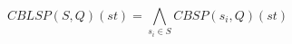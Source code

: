 \begin{itemize}
\begin{code}
        \AgdaSpace{}%
        \AgdaSpace{}%
        \AgdaSymbol{)}\<%
        \\
        \\[\AgdaEmptyExtraSkip]%
        \>[2]\AgdaSpace{}%
        \AgdaSymbol{:}\AgdaSpace{}%
        \AgdaSymbol{(}\AgdaSpace{}%
        \AgdaSpace{}%
        \AgdaSymbol{)}\AgdaSpace{}%
        \AgdaSpace{}%
        \<%
        \\
        \>[2]\AgdaSpace{}%
        \AgdaSymbol{(}\AgdaSpace{}%
        \AgdaOperator{\AgdaInductiveConstructor{,}}\AgdaSpace{}%
        \AgdaSymbol{)}\AgdaSpace{}%
        \AgdaSymbol{=}\AgdaSpace{}%
        \AgdaSpace{}%
        \AgdaSpace{}%
        \AgdaSpace{}%
        \AgdaSpace{}%
        \AgdaSpace{}%
        \AgdaSpace{}%
        \AgdaSpace{}%
        \AgdaSpace{}%
        \AgdaSpace{}%
        \AgdaSymbol{(}\AgdaSpace{}%
        \AgdaSymbol{(}\AgdaSpace{}%
        \AgdaOperator{\AgdaInductiveConstructor{,}}\AgdaSpace{}%
        \AgdaSymbol{)))}\AgdaSpace{}%
        \<%
    \end{code}
    \begin{equation}
        CBLSP(S , Q)(st) = \bigwedge\limits_{s_i \in S} CBSP(s_i, Q)(st)
    \end{equation}
\end{itemize}



    

